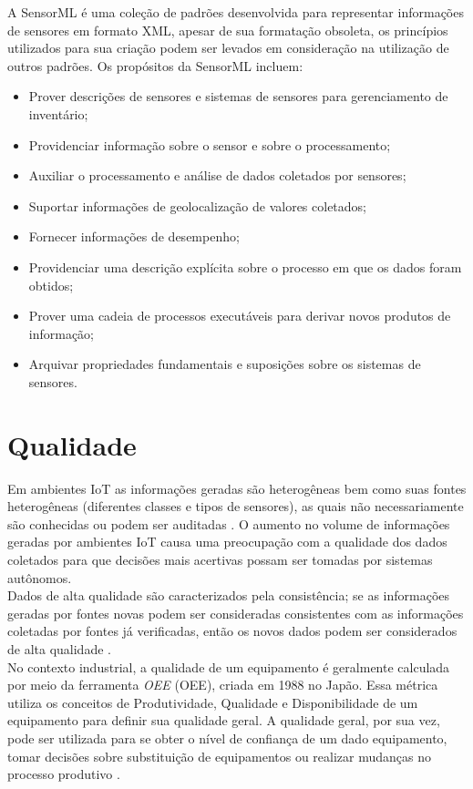      \quad A \acrfull{SensorML} \cite{SML} é uma coleção de padrões
    desenvolvida para representar informações de sensores em formato XML, apesar de sua formatação obsoleta, os princípios utilizados para sua criação podem ser levados em consideração na utilização de outros padrões. Os propósitos da \acrshort{SensorML} incluem:
    \begin{itemize}
      \item Prover descrições de sensores e sistemas de sensores para gerenciamento de inventário;
      \item Providenciar informação sobre o sensor e sobre o processamento;
      \item Auxiliar o processamento e análise de dados coletados por sensores;
      \item Suportar informações de geolocalização de valores coletados;
      \item Fornecer informações de desempenho;
      \item Providenciar uma descrição explícita sobre o processo em que os dados foram obtidos;
      \item Prover uma cadeia de processos executáveis para derivar novos produtos de informação;
      \item Arquivar propriedades fundamentais e suposições sobre os sistemas de sensores.
    \end{itemize}
\section{Qualidade}
\label{sec:qualidade}
\quad Em ambientes \acrshort{IoT} as informações geradas são heterogêneas bem como suas fontes heterogêneas (diferentes classes e tipos de sensores), as quais não necessariamente são conhecidas ou podem ser auditadas \cite{dataquality}. O aumento no volume de informações geradas por ambientes \acrshort{IoT} causa uma preocupação com a qualidade dos dados coletados para que decisões mais acertivas possam ser tomadas por sistemas autônomos.
\\\null\quad Dados de alta qualidade são caracterizados pela consistência; se as informações geradas por fontes novas podem ser consideradas consistentes com as informações coletadas por fontes já verificadas, então os novos dados podem ser considerados de alta qualidade \cite{dataquality}.
\\\null\quad No contexto industrial, a qualidade de um equipamento é geralmente calculada por meio da ferramenta \textit{\acrlong{OEE}} (\acrshort{OEE}), criada em 1988 no Japão. Essa métrica utiliza os conceitos de Produtividade, Qualidade e Disponibilidade de um equipamento para definir sua qualidade geral. A qualidade geral, por sua vez, pode ser utilizada para se obter o nível de confiança de um dado equipamento, tomar decisões sobre substituição de equipamentos ou realizar mudanças no processo produtivo \cite{artigoOEE}.

